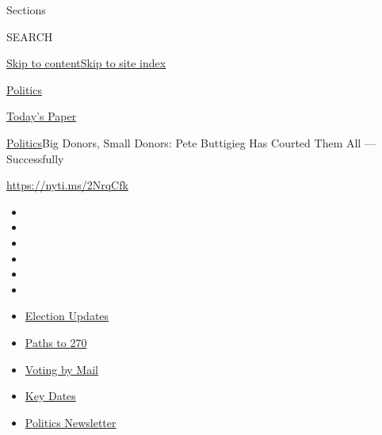Sections

SEARCH

\protect\hyperlink{site-content}{Skip to
content}\protect\hyperlink{site-index}{Skip to site index}

\href{https://www.nytimes3xbfgragh.onion/section/politics}{Politics}

\href{https://myaccount.nytimes3xbfgragh.onion/auth/login?response_type=cookie\&client_id=vi}{}

\href{https://www.nytimes3xbfgragh.onion/section/todayspaper}{Today's
Paper}

\href{/section/politics}{Politics}\textbar{}Big Donors, Small Donors:
Pete Buttigieg Has Courted Them All --- Successfully

\url{https://nyti.ms/2NrqCfk}

\begin{itemize}
\item
\item
\item
\item
\item
\item
\end{itemize}

\begin{itemize}
\item
  \href{https://www.nytimes3xbfgragh.onion/live/2020/09/07/us/trump-vs-biden?action=click\&pgtype=Article\&state=default\&region=TOP_BANNER\&context=storylines_menu}{Election
  Updates}
\item
  \href{https://www.nytimes3xbfgragh.onion/interactive/2020/us/elections/election-states-biden-trump.html?action=click\&pgtype=Article\&state=default\&region=TOP_BANNER\&context=storylines_menu}{Paths
  to 270}
\item
  \href{https://www.nytimes3xbfgragh.onion/interactive/2020/08/31/us/politics/vote-by-mail-deadlines.html?action=click\&pgtype=Article\&state=default\&region=TOP_BANNER\&context=storylines_menu}{Voting
  by Mail}
\item
  \href{https://www.nytimes3xbfgragh.onion/interactive/2019/us/elections/2020-presidential-election-calendar.html?action=click\&pgtype=Article\&state=default\&region=TOP_BANNER\&context=storylines_menu}{Key
  Dates}
\item
  \href{https://www.nytimes3xbfgragh.onion/newsletters/politics?action=click\&pgtype=Article\&state=default\&region=TOP_BANNER\&context=storylines_menu}{Politics
  Newsletter}
\end{itemize}

